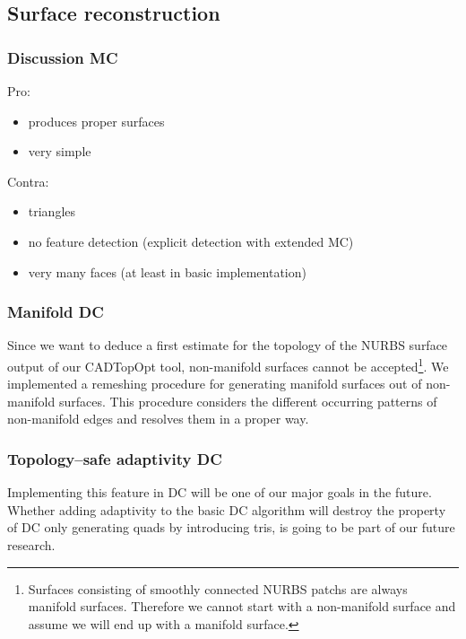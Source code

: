 \subsection{Surface reconstruction}

\subsubsection{Discussion \ac{MC}}
Pro:
\begin{itemize}
\item produces proper  surfaces
\item very simple
\end{itemize}
Contra:
\begin{itemize}
\item triangles
\item no feature detection (explicit detection with extended MC)
\item very many faces (at least in basic implementation)
\end{itemize}

\subsubsection{Manifold \ac{DC}}
Since we want to deduce a first estimate for the topology of the \ac{NURBS} surface output of our \ac{CADTopOpt} tool, non-manifold surfaces cannot be accepted\footnote{Surfaces consisting of smoothly connected \ac{NURBS} \acp{patch} are always manifold surfaces. Therefore we cannot start with a non-manifold surface and assume we will end up with a manifold surface.}. We implemented a remeshing procedure for generating manifold surfaces out of non-manifold surfaces. This procedure considers the different occurring patterns of non-manifold edges and resolves them in a proper way. 

\subsubsection{Topology--safe adaptivity \ac{DC}}
Implementing this feature in \ac{DC} will be one of our major goals in the future. Whether adding adaptivity to the basic \ac{DC} algorithm will destroy the property of \ac{DC} only generating \acp{quad} by introducing \acp{tri}, is going to be part of our future research.

